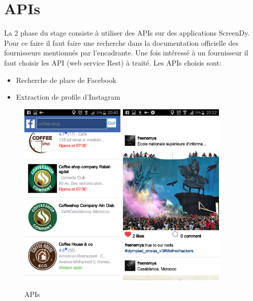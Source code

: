 \documentclass[12pt,a4paper]{report}
\begin{document}
	 \section{APIs}
La 2 phase du stage consiste à utiliser des APIs sur des applications ScreenDy.\\
Pour ce faire il faut faire une recherche dans la documentation officielle des fournisseurs mentionnés par l'encadrante. Une fois intéressé à un fournisseur il faut choisir les API (web service Rest) à traité.
Les APIs choisis sont:\\
	\begin{itemize}
		\item Recherche de place de Facebook
		\item Extraction de profile d'Instagram
	\end{itemize}

	

	\begin{figure}
	\includegraphics[width=5cm]{./graphics/fb.png}\hfill
	\includegraphics[width=5cm]{./graphics/instagram.png}
	\caption{APIs}
	\end{figure}
				
\end{document}
